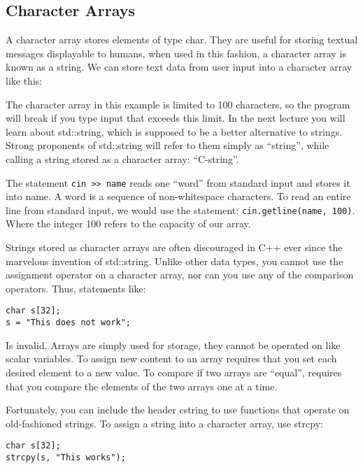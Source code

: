 \documentclass[a4paper,12pt]{article}
\begin{document}
\subsection*{Character Arrays}

A character array stores elements of type char. They are useful for storing textual messages displayable to humans, when used in this fashion, a character array is known as a string. We can store text data from user input into a character array like this:



The character array in this example is limited to 100 characters, so the program will break if you type input that exceeds this limit. In the next lecture you will learn about std::string, which is supposed to be a better alternative to strings. Strong proponents of std::string will refer to them simply as ``string'', while calling a string stored as a character array: ``C-string''. 

The statement \texttt{cin >> name} reads one ``word'' from standard input and stores it into name. A word is a sequence of non-whitespace characters. To read an entire line from standard input, we would use the statement: \texttt{cin.getline(name, 100)}. Where the integer 100 refers to the capacity of our array.

Strings stored as character arrays are often discouraged in C++ ever since the marvelous invention of std::string. Unlike other data types, you cannot use the assignment operator on a character array, nor can you use any of the comparison operators. Thus, statements like:

\begin{lstlisting}
char s[32];
s = "This does not work";
\end{lstlisting}

Is invalid. Arrays are simply used for storage, they cannot be operated on like scalar variables. To assign new content to an array requires that you set each desired element to a new value. To compare if two arrays are ``equal'', requires that you compare the elements of the two arrays one at a time.

Fortunately, you can include the header cstring to use functions that operate on old-fashioned strings. To assign a string into a character array, use strcpy: 

\begin{lstlisting}
char s[32];
strcpy(s, "This works");
\end{lstlisting}
\end{document}
